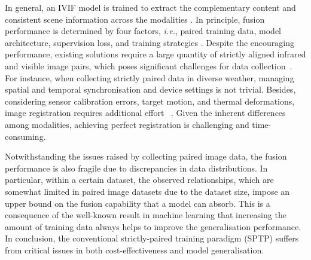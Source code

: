 In general, an IVIF model is trained to extract the complementary content and consistent scene information across the modalities \cite{densefuse, u2fusion, lrrnet, tgfuse, mufusion, cddfuse, xie2024, song2025, fusionbooster}. 
In principle, fusion performance is determined by four factors, \textit{i.e.}, paired training data, model architecture, supervision loss, and training strategies \cite{review_2}. 
Despite the encouraging performance, existing solutions require a large quantity of strictly aligned infrared and visible image pairs, which poses significant challenges for data collection~\cite{review_1}.
For instance, when collecting strictly paired data in diverse weather, managing spatial and temporal synchronisation and device settings is not trivial.
Besides, considering sensor calibration errors, target motion, and thermal deformations, image registration requires additional effort ~\cite{joint_regisfusion_1,step_regisfusion_1, step_regisfusion_2, step_regisfusion_3}.
Given the inherent differences among modalities, achieving perfect registration is challenging and time-consuming.

Notwithstanding the issues raised by collecting paired image data, the fusion performance is also fragile due to discrepancies in data distributions.
In particular, within a certain dataset, the observed relationships, which are somewhat limited in paired image datasets due to the dataset size, impose an upper bound on the fusion capability that a model can absorb. 
This is a consequence of the well-known result in machine learning that increasing the amount of training data always helps to improve the generalisation performance. 
In conclusion, the conventional strictly-paired training paradigm (SPTP) suffers from critical issues in both cost-effectiveness and model generalisation. 

